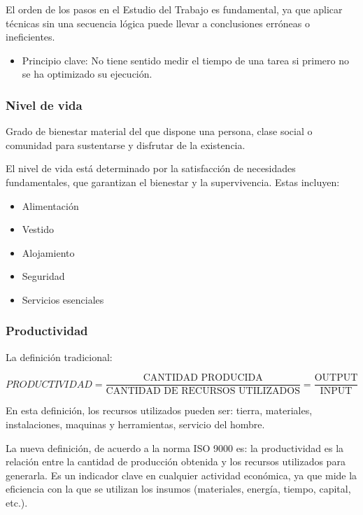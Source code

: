 \documentclass[a4paper,oneside,11pt]{article}
\begin{document}
El orden de los pasos en el Estudio del Trabajo es fundamental, ya que aplicar técnicas sin una secuencia lógica puede llevar a conclusiones erróneas o ineficientes.

\begin{itemize}
    \item Principio clave: No tiene sentido medir el tiempo de una tarea si primero no se ha optimizado su ejecución.
\end{itemize}

\subsubsection{Nivel de vida}

Grado de bienestar material del que dispone una persona, clase social o comunidad para sustentarse y disfrutar de la existencia.


El nivel de vida está determinado por la satisfacción de necesidades fundamentales, que garantizan el bienestar y la supervivencia. Estas incluyen:
\begin{itemize}
    \item Alimentación
    \item Vestido 
    \item Alojamiento
    \item Seguridad 
    \item Servicios esenciales
\end{itemize}

\subsubsection{Productividad}

La definición tradicional:

\begin{equation}
    PRODUCTIVIDAD = \dfrac{\text{CANTIDAD PRODUCIDA}}{\text{CANTIDAD DE RECURSOS UTILIZADOS}} = \dfrac{\text{OUTPUT}}{\text{INPUT}}
\end{equation}

En esta definición, los recursos utilizados pueden ser: tierra, materiales, instalaciones, maquinas y herramientas, servicio del hombre.

La nueva definición, de acuerdo a la norma ISO 9000 es: la productividad es la relación entre la cantidad de producción obtenida y los recursos utilizados para generarla. Es un indicador clave en cualquier actividad económica, ya que mide la eficiencia con la que se utilizan los insumos (materiales, energía, tiempo, capital, etc.).
\end{document}
